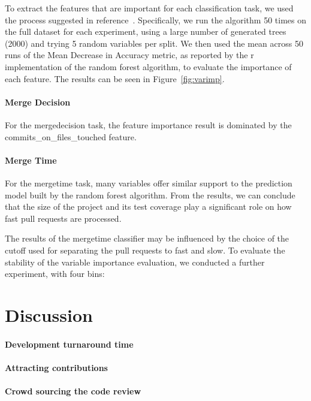 \documentclass{sig-alternate}
\begin{document}
To extract the features that are important for each classification task, we
used the process suggested in reference~\cite{Genue10}. Specifically, we run
the algorithm 50 times on the full dataset for each experiment, using a large
number of generated trees (2000) and trying 5 random variables per split. We
then used the mean across 50 runs of the  Mean Decrease in Accuracy metric, as
reported by the {\sc r} implementation of the random forest algorithm, to
evaluate the importance of each feature. The results can be seen in
Figure~\ref{fig:varimp}.

\paragraph{Merge Decision}

For the \textsf{mergedecision} task, the feature importance result is dominated
by the \textsf{commits\_on\_files\_touched} feature. 

\paragraph{Merge Time}

For the \textsf{mergetime} task, many variables offer similar support to the
prediction model built by the random forest algorithm. From the results, we can
conclude that the size of the project and its test coverage play a significant
role on how fast pull requests are processed. 

The results of the \textsf{mergetime} classifier may be influenced by the choice of the cutoff used for separating the pull requests to fast and slow.
To evaluate the stability of the variable importance evaluation, we conducted
a further experiment, with four bins: 


\section{Discussion}
\label{sec:discussion}

\paragraph{Development turnaround time}

\paragraph{Attracting contributions}

\paragraph{Crowd sourcing the code review}
\end{document}

